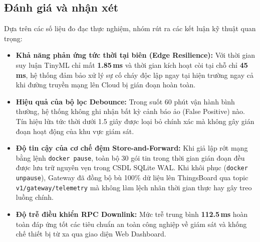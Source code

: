 \subsection{Đánh giá và nhận xét}
Dựa trên các số liệu đo đạc thực nghiệm, nhóm rút ra các kết luận kỹ thuật quan trọng:
\begin{itemize}
    \item \textbf{Khả năng phản ứng tức thời tại biên (Edge Resilience):} Với thời gian suy luận TinyML chỉ mất \textbf{1.85\,ms} và thời gian kích hoạt còi tại chỗ chỉ \textbf{45\,ms}, hệ thống đảm bảo xử lý sự cố cháy độc lập ngay tại hiện trường ngay cả khi đường truyền mạng lên Cloud bị gián đoạn hoàn toàn.
    \item \textbf{Hiệu quả của bộ lọc Debounce:} Trong suốt 60 phút vận hành bình thường, hệ thống không ghi nhận bất kỳ cảnh báo ảo (False Positive) nào. Tín hiệu lửa tức thời dưới 1.5 giây được loại bỏ chính xác mà không gây gián đoạn hoạt động của khu vực giám sát.
    \item \textbf{Độ tin cậy của cơ chế đệm Store-and-Forward:} Khi giả lập rớt mạng bằng lệnh \texttt{docker pause}, toàn bộ 30 gói tin trong thời gian gián đoạn đều được lưu trữ nguyên vẹn trong CSDL SQLite WAL. Khi khôi phục (\texttt{docker unpause}), Gateway đã đồng bộ bù 100\% dữ liệu lên ThingsBoard qua topic \texttt{v1/gateway/telemetry} mà không làm lệch nhãn thời gian thực hay gây treo luồng chính.
    \item \textbf{Độ trễ điều khiển RPC Downlink:} Mức trễ trung bình \textbf{112.5\,ms} hoàn toàn đáp ứng tốt các tiêu chuẩn an toàn công nghiệp về giám sát và khống chế thiết bị từ xa qua giao diện Web Dashboard.
\end{itemize}
